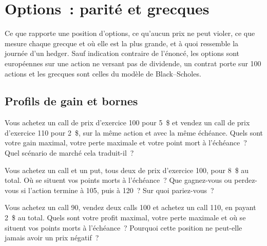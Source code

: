 \chapter{Options~: parité et grecques}\label{ch:iv2:options-parity-and-greeks}

\begin{ivtrains}
Ce que rapporte une position d'options, ce qu'aucun prix ne peut violer, ce que mesure chaque grecque et où elle est la plus grande, et à quoi ressemble la journée d'un hedger. Sauf indication contraire de l'énoncé, les options sont européennes sur une action ne versant pas de dividende, un contrat porte sur 100 actions et les grecques sont celles du modèle de Black--Scholes.
\end{ivtrains}

\section{Profils de gain et bornes}

\begin{question}\label{iq:iv2:options-parity-and-greeks:1}
Vous achetez un call de prix d'exercice 100 pour 5~\$ et vendez un call de prix d'exercice 110 pour 2~\$, sur la même action et avec la même échéance. Quels sont votre gain maximal, votre perte maximale et votre point mort à l'échéance~? Quel scénario de marché cela traduit-il~?
\end{question}

\begin{question}\label{iq:iv2:options-parity-and-greeks:2}
Vous achetez un call et un put, tous deux de prix d'exercice 100, pour 8~\$ au total. Où se situent vos points morts à l'échéance~? Que gagnez-vous ou perdez-vous si l'action termine à 105, puis à 120~? Sur quoi pariez-vous~?
\end{question}

\begin{question}\label{iq:iv2:options-parity-and-greeks:3}
Vous achetez un call 90, vendez deux calls 100 et achetez un call 110, en payant 2~\$ au total. Quels sont votre profit maximal, votre perte maximale et où se situent vos points morts à l'échéance~? Pourquoi cette position ne peut-elle jamais avoir un prix négatif~?
\end{question}

